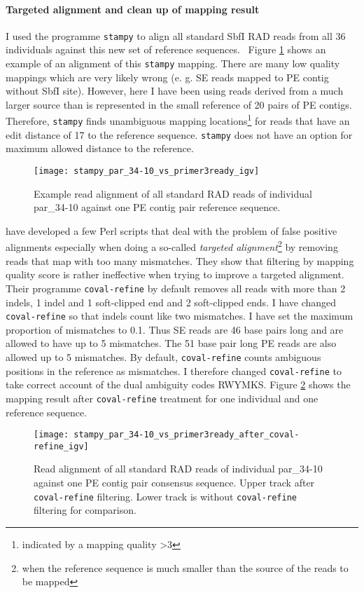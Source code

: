 \documentclass[a4paper,12pt,times,authoryear,twoside,print,index]{Classes/PhDThesisPSnPDF}\usepackage[]{graphicx}\usepackage[]{color}
\begin{document}
\paragraph{Targeted alignment and clean up of mapping result}
I used the programme \texttt{stampy} to align all standard SbfI RAD reads from all 36 individuals against this new set of reference sequences.~
Figure \ref{stampy_par_34-10_vs_primer3ready_igv} shows an example of an alignment of this \texttt{stampy} mapping. There are many low quality mappings which are very likely wrong (e. g. SE reads mapped to PE contig without SbfI site). However, here I have been using reads derived from a much larger source than is represented in the small reference of 20 pairs of PE contigs. Therefore, \texttt{stampy} finds unambiguous mapping locations\footnote{indicated by a mapping quality >3} for reads that have an \gls{edit distance} of 17 to the reference sequence. \texttt{stampy} does not have an option for maximum allowed distance to the reference.
%
\begin{figure}
\centering
\texttt{[image: stampy\_par\_34-10\_vs\_primer3ready\_igv]}
\caption{Example read alignment of all standard RAD reads of individual par\_34-10 against one PE contig pair reference sequence.}
\label{stampy_par_34-10_vs_primer3ready_igv}
\end{figure}
%
\cite{Kosugi2013} have developed a few Perl scripts that deal with the problem of false positive alignments especially when doing a so-called \emph{targeted alignment}\footnote{when the reference sequence is much smaller than the source of the reads to be mapped} by removing reads that map with too many mismatches. They show that filtering by mapping quality score is rather ineffective when trying to improve a targeted alignment. Their programme \texttt{coval-refine} by default removes all reads with more than 2 \glspl{indel}, 1 indel and 1 soft-clipped end and 2 soft-clipped ends. I have changed \texttt{coval-refine} so that indels count like two mismatches. I have set the maximum proportion of mismatches to 0.1. Thus SE reads are 46 base pairs long and are allowed to have up to 5 mismatches. The 51 base pair long PE reads are also allowed up to 5 mismatches. By default, \texttt{coval-refine} counts ambiguous positions in the reference as mismatches. I therefore changed \texttt{coval-refine} to take correct account of the dual ambiguity codes RWYMKS. Figure \ref{coval-refine} shows the mapping result after \texttt{coval-refine} treatment for one individual and one reference sequence.
%
\begin{figure}
\centering
\texttt{[image: stampy\_par\_34-10\_vs\_primer3ready\_after\_coval-refine\_igv]}
\caption{Read alignment of all standard RAD reads of individual par\_34-10 against one PE contig pair consensus sequence. Upper track after \texttt{coval-refine} filtering. Lower track is without \texttt{coval-refine} filtering for comparison.}
\label{coval-refine}
\end{figure}
%
\end{document}
